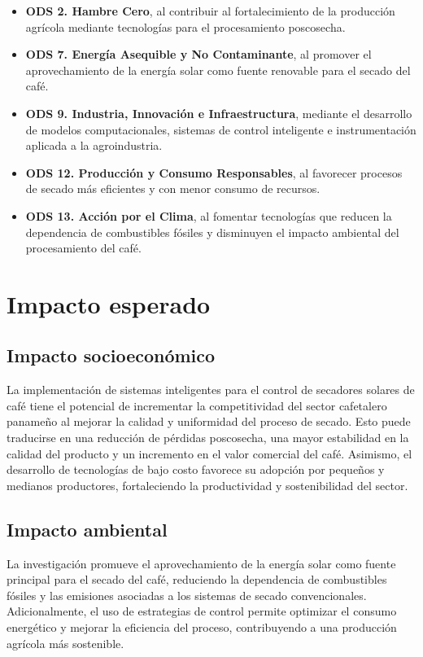 \begin{itemize}
\item \textbf{ODS 2. Hambre Cero}, al contribuir al fortalecimiento de la producción agrícola mediante tecnologías para el procesamiento poscosecha.

\item \textbf{ODS 7. Energía Asequible y No Contaminante}, al promover el aprovechamiento de la energía solar como fuente renovable para el secado del café.

\item \textbf{ODS 9. Industria, Innovación e Infraestructura}, mediante el desarrollo de modelos computacionales, sistemas de control inteligente e instrumentación aplicada a la agroindustria.

\item \textbf{ODS 12. Producción y Consumo Responsables}, al favorecer procesos de secado más eficientes y con menor consumo de recursos.

\item \textbf{ODS 13. Acción por el Clima}, al fomentar tecnologías que reducen la dependencia de combustibles fósiles y disminuyen el impacto ambiental del procesamiento del café.
\end{itemize}


\section{Impacto esperado}
\subsection{Impacto socioeconómico}
La implementación de sistemas inteligentes para el control de secadores solares de café tiene el potencial de incrementar la competitividad del sector cafetalero panameño al mejorar la calidad y uniformidad del proceso de secado. Esto puede traducirse en una reducción de pérdidas poscosecha, una mayor estabilidad en la calidad del producto y un incremento en el valor comercial del café. Asimismo, el desarrollo de tecnologías de bajo costo favorece su adopción por pequeños y medianos productores, fortaleciendo la productividad y sostenibilidad del sector.

\subsection{Impacto ambiental}
La investigación promueve el aprovechamiento de la energía solar como fuente principal para el secado del café, reduciendo la dependencia de combustibles fósiles y las emisiones asociadas a los sistemas de secado convencionales. Adicionalmente, el uso de estrategias de control permite optimizar el consumo energético y mejorar la eficiencia del proceso, contribuyendo a una producción agrícola más sostenible.

